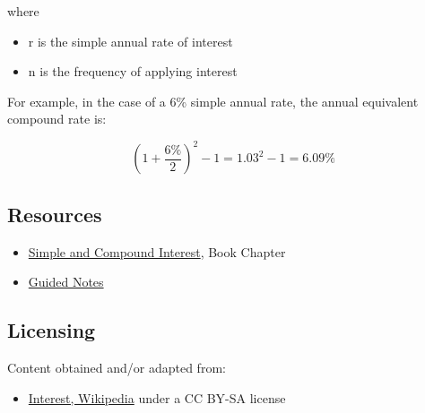 where



\begin{itemize}
    \item r is the simple annual rate of interest
    \item n is the frequency of applying interest
\end{itemize}

For example, in the case of a 6\% simple annual rate, the annual equivalent compound rate is:



$$\left(1 + \frac{6\%}{2}\right)^2 - 1 = 1.03^2 - 1 = 6.09\%$$




\subsection{Resources}
\label{sss:reso-55b5}




\begin{itemize}
    \item \href{https://mathresearch.utsa.edu/wikiFiles/MAT1053/Simple_and_Compound_Interest/MAT1053_M7.1Simple_and_Compound_Interest.pdf}{Simple and Compound Interest}, Book Chapter
    \item \href{https://mathresearch.utsa.edu/wikiFiles/MAT1053/Simple_and_Compound_Interest/MAT1053_M7.1Simple_and_Compound_InterestGN.pdf}{Guided Notes}
\end{itemize}


\subsection{Licensing}
\label{sss:lice-7352}




Content obtained and/or adapted from:



\begin{itemize}
    \item \href{https://en.wikipedia.org/wiki/Interest}{Interest, Wikipedia} under a CC BY-SA license
\end{itemize}


